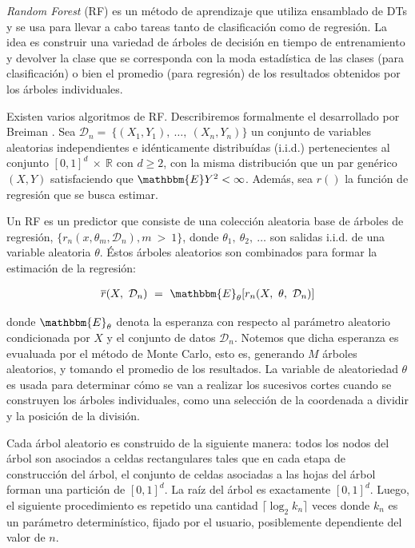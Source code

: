     \par \textit{Random Forest} (RF) es un método de aprendizaje que utiliza ensamblado de DTs y se
      usa para llevar a cabo tareas tanto de clasificación como de regresión.
      La idea es construir una variedad de árboles de decisión en tiempo de entrenamiento
      y devolver la clase que se corresponda con la moda estadística de las clases
      (para clasificación) o bien el promedio (para regresión) de los resultados
      obtenidos por los árboles individuales.

    \par Existen varios algoritmos de RF. Describiremos formalmente el desarrollado
      por Breiman \cite{random_forest}.
      Sea $\mathcal{D}_{n} = \ \{ (X_{1}, Y_{1}), \ \dots, \ (X_{n}, Y_{n})\}$
      un conjunto de variables aleatorias independientes e idénticamente distribuídas (i.i.d.)
      pertenecientes al conjunto $[0,1]^{d} \ \times \ \mathbb{R} $ con $d \geq 2$,
      con la misma distribución que un par genérico $(X,Y)$ satisfaciendo que
      $\mathbbm{E}Y^{2} < \infty$. Además, sea $r()$ la función de regresión que se busca estimar.

    \par Un RF es un predictor que consiste de una colección aleatoria base
      de árboles de regresión, $\{ r_{n}(x, \theta_{m}, \mathcal{D}_{n}), m \ > \ 1 \}$, donde
      $\theta_{1},\ \theta_{2},\ \dots$ son salidas i.i.d. de una variable aleatoria
      $\theta$. Éstos árboles aleatorios son combinados para formar la estimación
      de la regresión:

      \begin{align}
        \overline{r}(X,\ \mathcal{D}_{n})\ =\ \mathbbm{E}_{\theta}[r_{n}(X,\ \theta,\ \mathcal{D}_{n})]
      \end{align}

      donde $\mathbbm{E}_{\theta}$ denota la esperanza con respecto al parámetro aleatorio
      condicionada por $X$ y el conjunto de datos $\mathcal{D}_{n}$. Notemos que
      dicha esperanza es evualuada por el método de Monte Carlo\cite{monte_carlo},
      esto es, generando $M$ árboles aleatorios, y tomando el promedio de los resultados.
      La variable de aleatoriedad $\theta$ es usada para determinar cómo se van a realizar los
      sucesivos cortes cuando se construyen los árboles individuales, como una selección
      de la coordenada a dividir y la posición de la división.

    \par Cada árbol aleatorio es construido de la siguiente manera: todos los nodos
      del árbol son asociados a celdas rectangulares tales que en cada etapa de
      construcción del árbol, el conjunto de celdas asociadas a las hojas del árbol
      forman una partición de $[0, 1]^{d}$. La raíz del árbol es exactamente $[0, 1]^{d}$.
      Luego, el siguiente procedimiento es repetido una cantidad $\lceil \log_{2}k_{n} \rceil$ veces
      donde $k_{n}$ es un parámetro determinístico, fijado por el usuario, posiblemente
      dependiente del valor de $n$.

